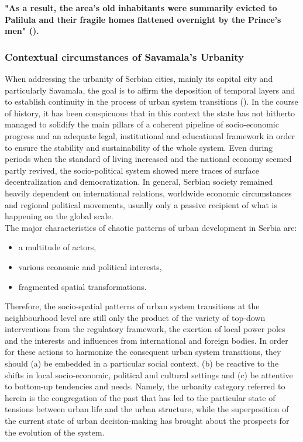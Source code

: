 \documentclass[11pt]{report}
\begin{document}
{{{{\textbf{"As a result, the area's old inhabitants were summarily evicted to Palilula  and their fragile homes flattened overnight by the Prince's men" (\href{Krusche}{\citealt{krusche_bureau_2015}}).}

\subsubsection{Contextual circumstances of Savamala's Urbanity}

When addressing the urbanity of Serbian cities, mainly its capital city and particularly Savamala, the goal is to affirm the deposition of temporal layers and to establish continuity in the process of urban system transitions (\href{Grozdanic}{\citealt{grozdanic_belgrade_2008}}).
In the course of history, it has been conspicuous that in this context the state has not hitherto managed to solidify the main pillars of a coherent pipeline of socio-economic progress and an adequate legal, institutional and educational framework in order to ensure the stability and sustainability of the whole system. Even during periods when the standard of living increased and the national economy seemed partly revived, the socio-political system showed mere traces of surface decentralization and democratization. In general, Serbian society remained heavily dependent on international relations, worldwide economic circumstances and regional political movements, usually only a passive recipient of what is happening on the global scale.
\\

The major characteristics of chaotic patterns of urban development in Serbia are:
\begin{itemize}
\item a multitude of actors,
\item various economic and political interests,
\item fragmented spatial transformations.
\end{itemize}

Therefore, the socio-spatial patterns of urban system transitions at the neighbourhood level are still only the product of the variety of top-down interventions from the regulatory framework, the exertion of local power poles and the interests and influences from international and foreign bodies. In order for these actions to harmonize the consequent urban system transitions, they should (a) be embedded in a particular social context, (b) be reactive to the shifts in local socio-economic, political and cultural settings and (c) be attentive to bottom-up tendencies and needs. Namely, the urbanity category referred to herein is the congregation of the past that has led to the particular state of tensions between urban life and the urban structure,
while the superposition of the current state of urban decision-making has brought about the prospects for the evolution of the system. 

}}}}
\end{document}
